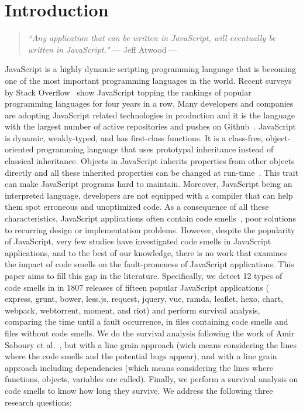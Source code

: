 \section{Introduction}
\begin{quote}
\emph{``Any application that can be written in JavaScript, will eventually be written in JavaScript."} \newline --- Jeff Atwood ---
\end{quote}

JavaScript is a highly dynamic scripting programming language that is becoming one of the most important programming languages in the world. Recent surveys by Stack Overflow~\cite{so:survay2016} show JavaScript topping the rankings of popular programming languages for four years in a row. Many developers and companies are adopting JavaScript related technologies in production and it is the language with the largest number of active repositories and pushes on Github~\cite{githut}. JavaScript is dynamic, weakly-typed, and has first-class functions. It is a class-free, object-oriented programming language that uses prototypal inheritance instead of classical inheritance. Objects in JavaScript inherits properties from other objects directly and all these inherited properties can be changed at run-time~\cite{fard2013jsnose}. This trait can make JavaScript programs hard to maintain. Moreover, JavaScript being an interpreted language, developers are not equipped with a compiler that can help them spot erroneous and unoptimized code. As a consequence of all these characteristics, JavaScript applications often contain code smells~\cite{fowler1997refactoring}, \ie{} poor solutions to recurring design or implementation problems. However, despite the popularity of JavaScript, very few studies have investigated code smells in JavaScript applications, and to the best of our knowledge, there is no work that examines the impact of code smells on the fault-proneness of JavaScript applications. This paper aims to fill this gap in the literature. Specifically, we detect 12 types of code smells in in {\color{blue}1807} releases of {\color{blue}fifteen} popular JavaScript applications (\ie{} express, grunt, bower, less.js, request, {\color{blue}jquery, vue, ramda, leaflet, hexo, chart, webpack, webtorrent, moment, and riot}) and perform survival analysis, comparing the time until a fault occurrence, in files containing code smells and files without code smells. {\color{blue}We do the survival analysis following the work of Amir Saboury et al.~\cite{saboury2017empirical}, but with a line grain approach (wich means considering the lines where the code smells and the potential bugs appear), and with a line grain approach including dependencies (which means considering the lines where functions, objects, variables are called). Finally, we perform a survival analysis on code smells to know how long they survive.} We address the following {\color{blue}three} research questions:

